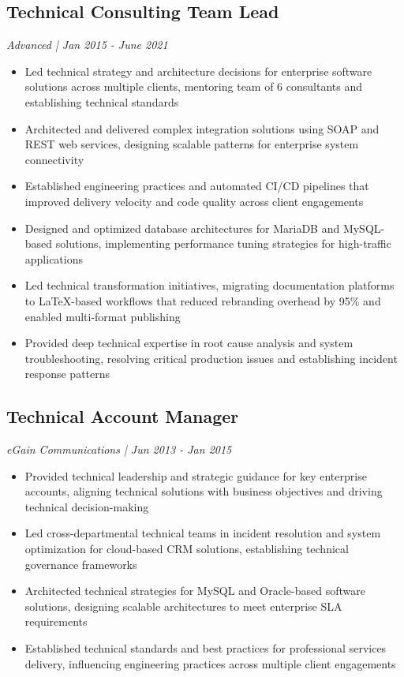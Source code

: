 \subsection{Technical Consulting Team Lead}
\textit{ Advanced | Jan 2015 - June 2021 }
\begin{itemize}
	\item Led technical strategy and architecture decisions for enterprise software solutions across multiple clients, mentoring team of 6 consultants and establishing technical standards
	\item Architected and delivered complex integration solutions using SOAP and REST web services, designing scalable patterns for enterprise system connectivity
	\item Established engineering practices and automated CI/CD pipelines that improved delivery velocity and code quality across client engagements
	\item Designed and optimized database architectures for MariaDB and MySQL-based solutions, implementing performance tuning strategies for high-traffic applications
	\item Led technical transformation initiatives, migrating documentation platforms to LaTeX-based workflows that reduced rebranding overhead by 95\% and enabled multi-format publishing
	\item Provided deep technical expertise in root cause analysis and system troubleshooting, resolving critical production issues and establishing incident response patterns
\end{itemize}
\vspace{6pt}

%
%
\subsection{Technical Account Manager}
\textit{ eGain Communications | Jun 2013 - Jan 2015 }
\begin{itemize}
	\item Provided technical leadership and strategic guidance for key enterprise accounts, aligning technical solutions with business objectives and driving technical decision-making
	\item Led cross-departmental technical teams in incident resolution and system optimization for cloud-based CRM solutions, establishing technical governance frameworks
	\item Architected technical strategies for MySQL and Oracle-based software solutions, designing scalable architectures to meet enterprise SLA requirements
	\item Established technical standards and best practices for professional services delivery, influencing engineering practices across multiple client engagements
\end{itemize}
\vspace{6pt}

